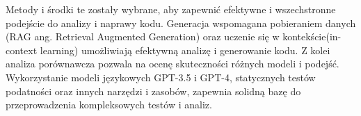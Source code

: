     

Metody i środki te zostały wybrane, aby zapewnić efektywne i wszechstronne podejście do analizy i naprawy kodu. Generacja wspomagana pobieraniem danych (RAG ang. Retrieval Augmented Generation) oraz uczenie się w kontekście(in-context learning) umożliwiają efektywną analizę i generowanie kodu. 
Z kolei analiza porównawcza pozwala na ocenę skuteczności różnych modeli i podejść. 
Wykorzystanie modeli językowych GPT-3.5 i GPT-4, statycznych testów podatności oraz innych narzędzi i zasobów, zapewnia solidną bazę do przeprowadzenia kompleksowych testów i analiz. 

